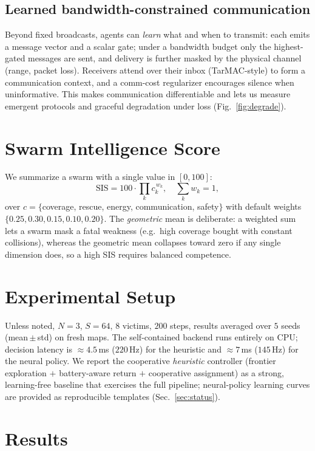 \documentclass[conference]{IEEEtran}
\begin{document}
\subsection{Learned bandwidth-constrained communication}
Beyond fixed broadcasts, agents can \emph{learn} what and when to transmit: each emits a message vector and a scalar gate; under a bandwidth budget only the highest-gated messages are sent, and delivery is further masked by the physical channel (range, packet loss). Receivers attend over their inbox (TarMAC-style) to form a communication context, and a comm-cost regularizer encourages silence when uninformative. This makes communication differentiable and lets us measure emergent protocols and graceful degradation under loss (Fig.~\ref{fig:degrade}).

\section{Swarm Intelligence Score}
We summarize a swarm with a single value in $[0,100]$:
\begin{equation}
\mathrm{SIS} = 100 \cdot \prod_{k} c_k^{\,w_k}, \quad \sum_k w_k = 1,
\end{equation}
over $c=\{$coverage, rescue, energy, communication, safety$\}$ with default weights
$\{0.25,0.30,0.15,0.10,0.20\}$. The \emph{geometric} mean is deliberate: a weighted
sum lets a swarm mask a fatal weakness (e.g.\ high coverage bought with constant
collisions), whereas the geometric mean collapses toward zero if any single
dimension does, so a high SIS requires balanced competence.

\section{Experimental Setup}
Unless noted, $N=3$, $S=64$, $8$ victims, $200$ steps, results averaged over $5$
seeds (mean\,$\pm$\,std) on fresh maps. The self-contained backend runs entirely on
CPU; decision latency is $\approx 4.5$\,ms ($220$\,Hz) for the heuristic and
$\approx 7$\,ms ($145$\,Hz) for the neural policy. We report the cooperative
\emph{heuristic} controller (frontier exploration $+$ battery-aware return $+$
cooperative assignment) as a strong, learning-free baseline that exercises the full
pipeline; neural-policy learning curves are provided as reproducible templates
(Sec.~\ref{sec:status}).

\section{Results}
\end{document}
